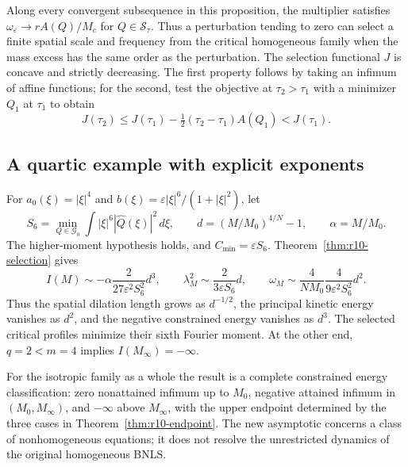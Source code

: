Along every convergent subsequence in this proposition, the multiplier
satisfies $\omega_\varepsilon\to rA(Q)/M_c$ for
$Q\in\mathcal S_\tau$. Thus a perturbation tending to zero can select
a finite spatial scale and frequency from the critical homogeneous
family when the mass excess has the same order as the perturbation.
The selection functional $J$ is concave and strictly decreasing. The
first property follows by taking an infimum of affine functions; for
the second, test the objective at $\tau_2>\tau_1$ with a minimizer
$Q_1$ at $\tau_1$ to obtain
\[
 J(\tau_2)\le J(\tau_1)-\tfrac12(\tau_2-\tau_1)A(Q_1)<J(\tau_1).
\]

\subsection{A quartic example with explicit exponents}

For $a_0(\xi)=|\xi|^4$ and
$b(\xi)=\varepsilon|\xi|^6/(1+|\xi|^2)$, let
\[
 S_6=\min_{Q\in\mathcal G_0}\int|\xi|^6|\widehat Q(\xi)|^2\,d\xi,
 \qquad d=(M/M_0)^{4/N}-1,\qquad \alpha=M/M_0.
\]
The higher-moment hypothesis holds, and $C_{\min}=\varepsilon S_6$.
Theorem~\ref{thm:r10-selection} gives
\[
 I(M)\sim-\alpha\frac{2}{27\varepsilon^2 S_6^2}d^3,
 \qquad \lambda_M^2\sim\frac{2}{3\varepsilon S_6}d,
 \qquad
 \omega_M\sim\frac{4}{NM_0}\frac{4}{9\varepsilon^2 S_6^2}d^2.
\]
Thus the spatial dilation length grows as $d^{-1/2}$, the principal
kinetic energy vanishes as $d^2$, and the negative constrained energy
vanishes as $d^3$. The selected critical profiles minimize their sixth
Fourier moment. At the other end, $q=2<m=4$ implies
$I(M_\infty)=-\infty$.

For the isotropic family as a whole the result is a complete constrained
energy classification: zero nonattained infimum up to $M_0$, negative
attained infimum in $(M_0,M_\infty)$, and $-\infty$ above
$M_\infty$, with the upper endpoint determined by the three cases in
Theorem~\ref{thm:r10-endpoint}. The new asymptotic concerns a class of
nonhomogeneous equations; it does not resolve the unrestricted dynamics
of the original homogeneous BNLS.
